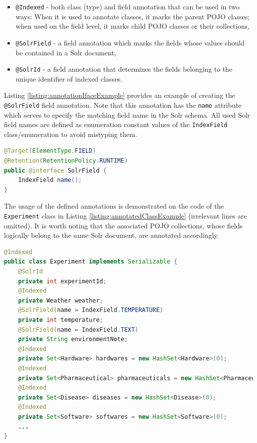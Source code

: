\begin{itemize}
	\item \texttt{@Indexed} - both class (type) and field annotation that can be used in two ways: When it is used to annotate classes, it marks the parent POJO classes; when used on the field level, it marks child POJO classes or their collections,
	\item \texttt{@SolrField} - a field annotation which marks the fields whose values should be contained in a Solr document,
	\item \texttt{@SolrId} - a field annotation that determines the fields belonging to the unique identifier of indexed classes.
\end{itemize}

Listing \ref{listing:annotationIfaceExample} provides an example of creating the \texttt{@SolrField} field annotation. 
Note that this annotation has the \texttt{name} attribute which serves to specify the matching field name in the Solr schema.
All used Solr field names are defined as enumeration constant values of the \texttt{IndexField} class/enumeration to avoid mistyping them.

\begin{lstlisting}[language=Java, caption={Example of Creating the \texttt{@SolrField} Annotation.}, label={listing:annotationIfaceExample}]
@Target(ElementType.FIELD)
@Retention(RetentionPolicy.RUNTIME)
public @interface SolrField {
    IndexField name();
}
\end{lstlisting}

The usage of the defined annotations is demonstrated on the code of the \texttt{Experiment} class in Listing \ref{listing:annotatedClassExample} (irrelevant lines are omitted). 
It is worth noting that the associated POJO collections, whose fields logically belong to the same Solr document, are annotated accordingly.

\begin{lstlisting}[language=Java, caption={Example of Using Indexing Annotations in the \texttt{Experiment} Class.}, label={listing:annotatedClassExample}]
@Indexed 
public class Experiment implements Serializable {
	@SolrId
	private int experimentId;
	@Indexed
	private Weather weather;
	@SolrField(name = IndexField.TEMPERATURE)
	private int temperature;
	@SolrField(name = IndexField.TEXT)
	private String environmentNote;
	@Indexed
	private Set<Hardware> hardwares = new HashSet<Hardware>(0);
	@Indexed
	private Set<Pharmaceutical> pharmaceuticals = new HashSet<Pharmaceutical>(0);
	@Indexed
	private Set<Disease> diseases = new HashSet<Disease>(0);
	@Indexed
	private Set<Software> softwares = new HashSet<Software>(0);
	...
}
\end{lstlisting}

